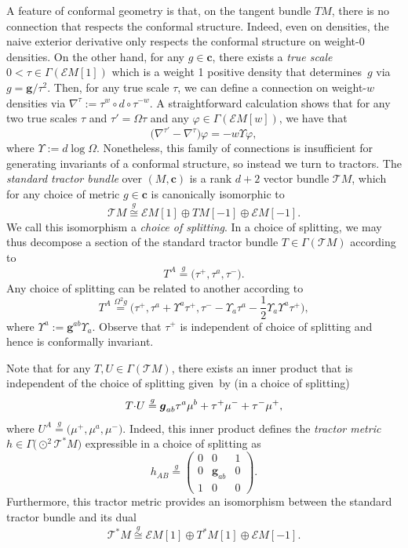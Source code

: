 \documentclass[pdftex]{sigma}
\numberwithin{equation}{section}
\newcommand{\ce}{\mathcal{E}}
\newcommand{\ct}{\mathcal{T}}
\newcommand{\cc}{\boldsymbol{c}}
\newcommand{\bg}{\boldsymbol{g}}
\renewcommand{\=}{\stackrel \Lambda =}
\newcommand{\csdot}{\hspace{-0.75mm} \cdot \hspace{-0.75mm}}
\begin{document}
A feature of conformal geometry is that, on the tangent bundle $TM$, there is no connection that respects the conformal structure. Indeed, even on densities, the naive exterior derivative only respects the conformal structure on weight-0 densities. On the other hand, for any $g \in \cc$, there exists a \textit{true scale} $0<\tau \in \Gamma(\ce M[1])$ which is a weight 1 positive density that determines~$g$ via~$g = \bg/\tau^2$. Then, for any true scale $\tau$, we can define a connection on weight-$w$ densities via $\nabla^\tau := \tau^w \circ d \circ \tau^{-w}$. A straightforward calculation shows that for any two true scales $\tau$ and $\tau' = \Omega \tau$ and any $\varphi \in \Gamma(\ce M[w])$, we have that
\[\bigl(\nabla^{\tau'} - \nabla^{\tau}\bigr) \varphi = -w \Upsilon \varphi ,\]
where $\Upsilon := d \log \Omega$. Nonetheless, this family of connections is insufficient for generating invariants of a conformal structure, so instead we turn to tractors. The \textit{standard tractor bundle} over $(M,\cc)$ is a rank $d+2$ vector bundle $\mathcal{T} M$, which for any choice of metric $g \in \cc$ is canonically isomorphic to
\[\mathcal{T}M \stackrel{g}{\cong} \ce M[1] \oplus TM[-1] \oplus \ce M[-1] .\]
We call this isomorphism a \textit{choice of splitting}. In a choice of splitting, we may thus decompose a section of the standard tractor bundle $T \in \Gamma(\ct M)$ according to
\[T^A \stackrel{g}{=} \bigl(\tau^+, \tau^a, \tau^-\bigr) .\]
Any choice of splitting can be related to another according to
\[T^A \stackrel{\Omega^2 g}{=} \biggl(\tau^+, \tau^a + \Upsilon^a \tau^+, \tau^- - \Upsilon_a \tau^a - \frac{1}{2} \Upsilon_a \Upsilon^a \tau^+\biggr) ,\]
where $\Upsilon^a := \bg^{ab} \Upsilon_a$. Observe that $\tau^+$ is independent of choice of splitting and hence is conformally invariant.

Note that for any $T,U \in \Gamma(\ct M)$, there exists an inner product that is independent of the choice of splitting given~by
(in a choice of splitting)
\[T \csdot U \stackrel{g}{=} \bg_{ab} \tau^a \mu^b + \tau^+ \mu^- + \tau^- \mu^+ ,\]
where $U^A \stackrel{g}{=} \bigl(\mu^+, \mu^a, \mu^-\bigr)$. Indeed, this inner product defines the \textit{tractor metric} $h \in \Gamma\bigl( \odot^2 \ct^* M\bigr)$ expressible in a choice of splitting as
\[h_{AB} \stackrel{g}{=} \begin{pmatrix}
0 & 0 & 1 \\
0 & \bg_{ab} & 0 \\
1 & 0 & 0
\end{pmatrix} .\]
Furthermore, this tractor metric provides an isomorphism between the standard tractor bundle and its dual
\[\ct^* M \stackrel{g}{\cong} \ce M[1] \oplus T^* M[1] \oplus \ce M[-1] .\]
\end{document}
